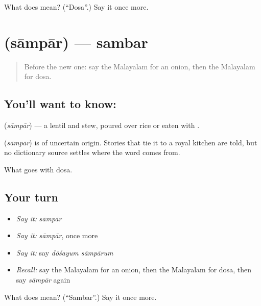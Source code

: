 \begin{tcolorbox}[breakable,colback=teal!4,colframe=teal!35!black,title={Before you move on}]
What does  mean? (\textquotedblleft{}Dosa\textquotedblright{}.) Say it once more.
\end{tcolorbox}
\section[\texorpdfstring{\ml{സാമ്പാർ} (sāmpār)}{സാമ്പാർ (sāmpār)}]{ (sāmpār) — sambar}

\label{lesson:ML-C132-sambar}



\begin{quote}
Before the new one: say the Malayalam for an onion, then the Malayalam for dosa.
\end{quote}

\subsection*{You'll want to know: }
\textbf{} (\emph{sāmpār}) — a lentil and \textbf{} stew, poured over rice or eaten with \textbf{}.

\begin{cousinweb}
\textbf{} (\emph{sāmpār}) is of uncertain origin. Stories that tie it to a royal kitchen are told, but no dictionary source settles where the word comes from.
\end{cousinweb}

\begin{grammarlens}[title={What you've built}]
What goes with dosa.
\end{grammarlens}

\subsection*{Your turn}
\begin{itemize}
\raggedright
  \item \emph{Say it:} \emph{sāmpār}
  \item \emph{Say it:} \emph{sāmpār}, once more
  \item \emph{Say it:} say \emph{dōśayum sāmpārum}
  \item \emph{Recall:} say the Malayalam for an onion, then the Malayalam for dosa, then say \emph{sāmpār} again
\end{itemize}

\begin{tcolorbox}[breakable,colback=teal!4,colframe=teal!35!black,title={Before you move on}]
What does  mean? (\textquotedblleft{}Sambar\textquotedblright{}.) Say it once more.
\end{tcolorbox}

